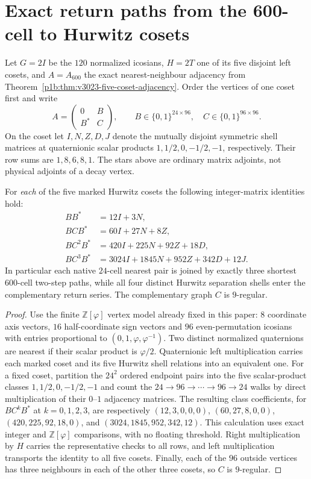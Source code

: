 \documentclass[11pt]{article}
\begin{document}
\section{Exact return paths from the 600-cell to Hurwitz cosets}
\label{p1b:sec:v3027-600-hurwitz-return}
Let $G=2I$ be the $120$ normalized icosians, $H=2T$ one of its
five disjoint left cosets, and $A=A_{600}$ the exact nearest-neighbour
adjacency from Theorem~\ref{p1b:thm:v3023-five-coset-adjacency}.
Order the vertices of one coset first and write
\[
 A=\begin{pmatrix}0&B\\B^*&C\end{pmatrix},\qquad
 B\in\{0,1\}^{24\times96},\quad C\in\{0,1\}^{96\times96}.
\]
On the coset let $I,N,Z,D,J$ denote the mutually disjoint symmetric
shell matrices at quaternionic scalar products $1,1/2,0,-1/2,-1$,
respectively. Their row sums are $1,8,6,8,1$. The stars above are
ordinary matrix adjoints, not physical adjoints of a decay vertex.

\begin{theorem}
\label{p1b:thm:v3027-600-hurwitz-returns}
For \emph{each} of the five marked Hurwitz cosets the following
integer-matrix identities hold:
\[
\boxed{\begin{aligned}
 BB^*&=12I+3N,\\
 BCB^*&=60I+27N+8Z,\\
 BC^2B^*&=420I+225N+92Z+18D,\\
 BC^3B^*&=3024I+1845N+952Z+342D+12J.
\end{aligned}}
\]
In particular each native $24$-cell nearest pair is joined by exactly
three shortest $600$-cell two-step paths, while all four distinct
Hurwitz separation shells enter the complementary return series.
The complementary graph $C$ is $9$-regular.
\end{theorem}
\begin{proof}
Use the finite $\mathbb Z[\varphi]$ vertex model already fixed in
this paper: $8$ coordinate axis vectors, $16$ half-coordinate sign
vectors and $96$ even-permutation icosians with entries proportional
to $(0,1,\varphi,\varphi^{-1})$. Two distinct normalized quaternions
are nearest if their scalar product is $\varphi/2$. Quaternionic left
multiplication carries each marked coset and its five Hurwitz shell
relations into an equivalent one. For a fixed coset, partition the
$24^2$ ordered endpoint pairs into the five scalar-product classes
$1,1/2,0,-1/2,-1$ and count the $24\to96\to\cdots\to96\to24$
walks by direct multiplication of their $0$--$1$ adjacency matrices.
The resulting class coefficients, for $BC^kB^*$ at $k=0,1,2,3$,
are respectively
$ (12,3,0,0,0)$,
$ (60,27,8,0,0)$,
$ (420,225,92,18,0)$, and
$ (3024,1845,952,342,12)$.
This calculation uses exact integer and $\mathbb Z[\varphi]$
comparisons, with no floating threshold. Right multiplication by
$H$ carries the representative checks to all rows, and left
multiplication transports the identity to all five cosets. Finally,
each of the $96$ outside vertices has three neighbours in each of
the other three cosets, so $C$ is $9$-regular.
\end{proof}
\end{document}
